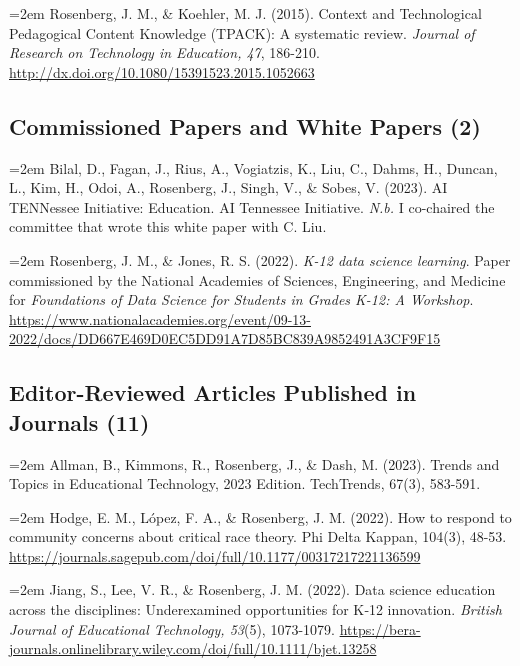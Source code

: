 \documentclass[
  14,
]{article}
\begin{document}
\hangindent=2em Rosenberg, J. M., \& Koehler, M. J. (2015). Context and
Technological Pedagogical Content Knowledge (TPACK): A systematic
review. \emph{Journal of Research on Technology in Education, 47},
186-210. \url{http://dx.doi.org/10.1080/15391523.2015.1052663}

\hypertarget{commissioned-papers-and-white-papers-2}{%
\subsection{Commissioned Papers and White Papers
(2)}\label{commissioned-papers-and-white-papers-2}}

\hangindent=2em Bilal, D., Fagan, J., Rius, A., Vogiatzis, K., Liu, C.,
Dahms, H., Duncan, L., Kim, H., Odoi, A., Rosenberg, J., Singh, V., \&
Sobes, V. (2023). AI TENNessee Initiative: Education. AI Tennessee
Initiative. \emph{N.b.} I co-chaired the committee that wrote this white
paper with C. Liu.

\hangindent=2em Rosenberg, J. M., \& Jones, R. S. (2022). \emph{K-12
data science learning}. Paper commissioned by the National Academies of
Sciences, Engineering, and Medicine for \emph{Foundations of Data
Science for Students in Grades K-12: A Workshop}.
\url{https://www.nationalacademies.org/event/09-13-2022/docs/DD667E469D0EC5DD91A7D85BC839A9852491A3CF9F15}

\hypertarget{editor-reviewed-articles-published-in-journals-11}{%
\subsection{Editor-Reviewed Articles Published in Journals
(11)}\label{editor-reviewed-articles-published-in-journals-11}}

\hangindent=2em Allman, B., Kimmons, R., Rosenberg, J., \& Dash, M.
(2023). Trends and Topics in Educational Technology, 2023 Edition.
TechTrends, 67(3), 583-591.

\hangindent=2em Hodge, E. M., López, F. A., \& Rosenberg, J. M. (2022).
How to respond to community concerns about critical race theory. Phi
Delta Kappan, 104(3), 48-53.
\url{https://journals.sagepub.com/doi/full/10.1177/00317217221136599}

\hangindent=2em Jiang, S., Lee, V. R., \& Rosenberg, J. M. (2022). Data
science education across the disciplines: Underexamined opportunities
for K‐12 innovation. \emph{British Journal of Educational Technology,
53}(5), 1073-1079.
\url{https://bera-journals.onlinelibrary.wiley.com/doi/full/10.1111/bjet.13258}
\end{document}
